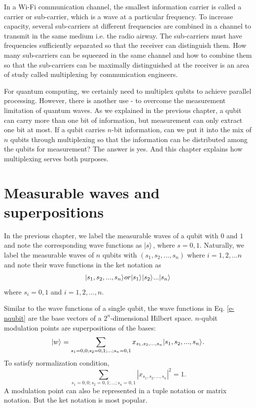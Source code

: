 \documentclass[oneside, letter, 12pt]{book}
\begin{document}
In a Wi-Fi communication channel, the smallest information carrier is called a carrier or sub-carrier, which is a wave at a particular frequency. To increase capacity, several sub-carriers at different frequencies are combined in a channel to transmit in the same medium i.e. the radio airway. The sub-carriers must have frequencies sufficiently separated so that the receiver can distinguish them. How many sub-carriers can be squeezed in the same channel and how to combine them so that the sub-carriers can be maximally distinguished at the receiver is an area of study called multiplexing by communication engineers.

For quantum computing, we certainly need to multiplex qubits to achieve parallel processing. However, there is another use - to overcome the measurement limitation of quantum waves. As we explained in the previous chapter, a qubit can carry more than one bit of information, but measurement can only extract one bit at most. If a qubit carries $n$-bit information, can we put it into the mix of $n$ qubits through multiplexing so that the information can be distributed among the qubits for measurement? The answer is yes. And this chapter explains how multiplexing serves both purposes.

\section{Measurable waves and superpositions}
In the previous chapter, we label the measurable waves of a qubit with $0$ and $1$ and note the corresponding wave functions as $\vert {s} \rangle_{}$, where $s=0, 1$. Naturally, we label the measurable waves of $n$ qubits with $(s_1, s_2, ..., s_n)$ where $i=1, 2, ...n$ and note their wave functions in the ket notation as
\begin{equation}\label{e-nqubit}
    \vert {s_1, s_2, ..., s_n} \rangle_{} or
    \vert {s_1} \rangle_{} \vert {s_2} \rangle_{} ... \vert {s_n} \rangle_{}
\end{equation}
where $s_i = 0, 1$ and $i=1, 2, ..., n$.

Similar to the wave functions of a single qubit, the wave functions in Eq. \ref{e-nqubit} are the base vectors of a $2^n$-dimensional Hilbert space. $n$-qubit modulation points are superpositions of the bases:
\begin{equation}
    \vert {w} \rangle_{} = \sum_{s_1=0,0; s_2=0,1; ...; s_n=0,1} x_{s_1, s_2, ..., s_n} \vert {s_1, s_2, ..., s_n} \rangle_{}.
\end{equation}
To satisfy normalization condition,
\begin{equation}
    \sum_{s_1=0,0; s_2=0,1; ...; s_n=0,1} |x_{s_1, s_2, ..., s_n}|^2 =1.
\end{equation}
A modulation point can also be represented in a tuple notation or matrix notation. But the ket notation is most popular.
\end{document}
